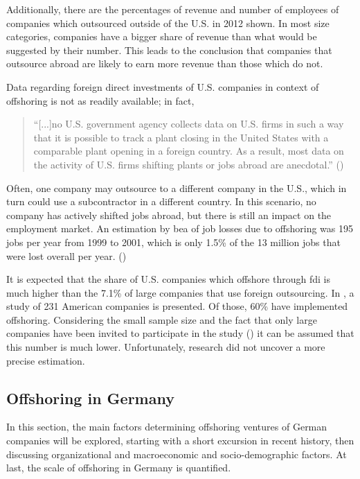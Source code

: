 
Additionally, there are the percentages of revenue and number of employees of companies which outsourced outside of the U.S. in 2012 shown. In most size categories, companies have a bigger share of revenue than what would be suggested by their number. This leads to the conclusion that companies that outsource abroad are likely to earn more revenue than those which do not.

Data regarding foreign direct investments of U.S. companies in context of offshoring is not as readily available; in fact, 
\begin{quote}
	``[...]no U.S. government agency collects data on U.S. firms in such a way that it is possible to track a plant closing in the United States with a comparable plant opening in a foreign country. As a result, most data on the activity of U.S. firms shifting plants or jobs abroad are anecdotal.'' (\cite{Jackson.2013})
\end{quote}



Often, one company may outsource to a different company in the U.S., which in turn could use a subcontractor in a different country. In this scenario, no company has actively shifted jobs abroad, but there is still an impact on the employment market. An estimation by \gls{bea} of job losses due to offshoring was 195  jobs per year from 1999 to 2001, which is only 1.5\% of the 13 million jobs that were lost overall per year. (\cite[pp. 14ff]{Kozlow.2006})

It is expected that the share of U.S. companies which offshore through \gls{fdi} is much higher than the 7.1\% of large companies that use foreign outsourcing. In \cite[pp. 167ff]{Hutzschenreuter.2007}, a study of 231 American companies is presented. Of those, 60\% have implemented offshoring. Considering the small sample size and the fact that only large companies have been invited to participate in the study (\cite[pp. 199f]{Hutzschenreuter.2007}) it can be assumed that this number is much lower. Unfortunately, research did not uncover a more precise estimation.

\subsection{Offshoring in Germany}
\label{sec:OffshoringGER}
In this section, the main factors determining offshoring ventures of German companies will be explored, starting with a short excursion in recent history, then discussing organizational and macroeconomic and socio-demographic factors. At last, the scale of offshoring in Germany is quantified.

